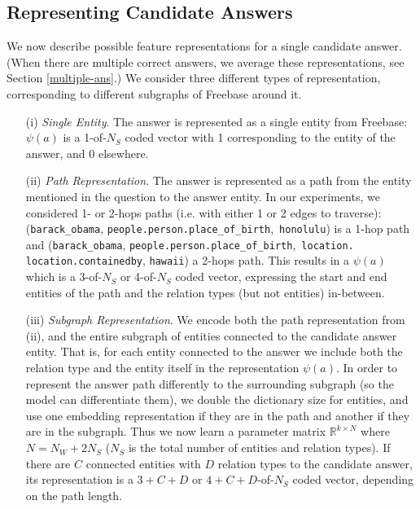 \documentclass[runningheads,a4paper]{llncs}
\newcommand{\fb}{{\sc Freebase}\xspace}
\newcommand{\ent}[1]{{\small {\tt #1}}}
\begin{document}
\subsection{Representing Candidate Answers} \label{ans-features}

We now describe possible feature representations for a single
candidate answer. (When there are multiple correct answers, we average these 
representations, see Section \ref{multiple-ans}.)
We consider three different types of representation,
corresponding to different subgraphs of \fb around
it.
\begin{itemize}
\item[(i)] {\it Single Entity}. The answer is represented 
as a single entity from \fb:
$\psi(a)$ is a 1-of-$N_S$ coded vector with 1 corresponding to the 
entity of the answer, and 0 elsewhere. 
\item[(ii)] {\it Path Representation}. The answer is represented as a
  path from the entity mentioned in the question to the answer
  entity.  In our experiments, we considered 1- or 2-hops paths
  (i.e. with either 1 or 2 edges to traverse):
(\ent{barack\_obama},
\ent{people.}\ent{person.}\ent{place\_of\_birth},~\ent{honolulu}) is a 1-hop path
and  (\ent{barack\_obama},
\ent{people.person.place\_of\_birth},~\ent{location.} \ent{location.containedby}, \ent{hawaii}) a 2-hops path.
This results in a $\psi(a)$ which is a 3-of-$N_S$ or 4-of-$N_S$ coded
  vector, expressing the start and end entities of the path and the
  relation types (but not entities) in-between.
\item[(iii)] {\it Subgraph Representation}. We encode both the path
  representation from (ii), and the entire subgraph of entities
  connected to the candidate answer entity. That is, for each entity
  connected to the answer we include both the relation type and the
  entity itself in the representation $\psi(a)$. In order to represent
  the answer path differently to the surrounding subgraph (so the
  model can differentiate them), we double the dictionary size for
  entities, and use one embedding representation if they are in the
  path and another if they are in the subgraph.  Thus we now learn a
  parameter matrix $\mathbb{R}^{k \times N}$ where $N = N_{W} + 2
  N_{S}$ ($N_{S}$ is the total number of entities and relation
  types). If there are $C$ connected entities with $D$ relation types
  to the candidate answer, its representation is a $3+C+D$ or
  $4+C+D$-of-$N_S$ coded vector, depending on the path length.


\end{itemize}
\end{document}
